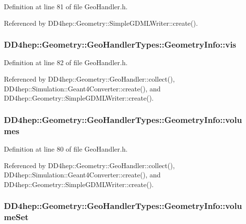 Definition at line 81 of file GeoHandler.h.

Referenced by DD4hep::Geometry::SimpleGDMLWriter::create().\hypertarget{class_d_d4hep_1_1_geometry_1_1_geo_handler_types_1_1_geometry_info_ac11f2e847e838a2b6a60f2f8d0f9a64c}{
\subsubsection[{vis}]{ {\bf DD4hep::Geometry::GeoHandlerTypes::GeometryInfo::vis}}}
\label{class_d_d4hep_1_1_geometry_1_1_geo_handler_types_1_1_geometry_info_ac11f2e847e838a2b6a60f2f8d0f9a64c}


Definition at line 82 of file GeoHandler.h.

Referenced by DD4hep::Geometry::GeoHandler::collect(), DD4hep::Simulation::Geant4Converter::create(), and DD4hep::Geometry::SimpleGDMLWriter::create().\hypertarget{class_d_d4hep_1_1_geometry_1_1_geo_handler_types_1_1_geometry_info_a67842e3e45b1330e99a86b794f3b9427}{
\subsubsection[{volumes}]{ {\bf DD4hep::Geometry::GeoHandlerTypes::GeometryInfo::volumes}}}
\label{class_d_d4hep_1_1_geometry_1_1_geo_handler_types_1_1_geometry_info_a67842e3e45b1330e99a86b794f3b9427}


Definition at line 80 of file GeoHandler.h.

Referenced by DD4hep::Geometry::GeoHandler::collect(), DD4hep::Simulation::Geant4Converter::create(), and DD4hep::Geometry::SimpleGDMLWriter::create().\hypertarget{class_d_d4hep_1_1_geometry_1_1_geo_handler_types_1_1_geometry_info_ae40dd08f18b956caf35d7fda40a57528}{
\subsubsection[{volumeSet}]{ {\bf DD4hep::Geometry::GeoHandlerTypes::GeometryInfo::volumeSet}}}
\label{class_d_d4hep_1_1_geometry_1_1_geo_handler_types_1_1_geometry_info_ae40dd08f18b956caf35d7fda40a57528}


